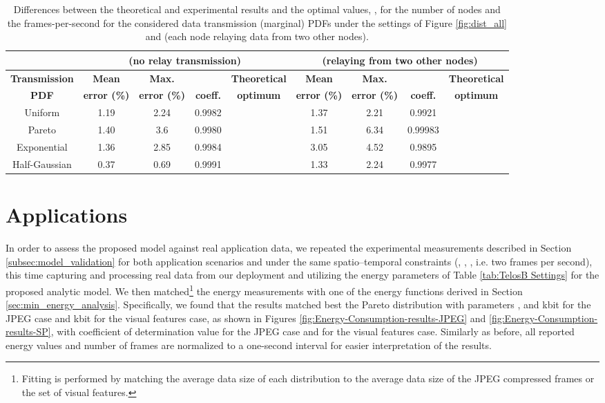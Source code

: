 \documentclass[twocolumn,english]{IEEEtran}
\providecommand{\tabularnewline}{\\}
\theoremstyle{plain}
\theoremstyle{definition}
\begin{document}
\begin{table*}
\begin{centering}
\caption{Differences between the theoretical and experimental results and the
optimal values, ,
for the number of nodes and the frames-per-second for the considered
data transmission (marginal) PDFs under the settings of Figure \ref{fig:dist_all}
and  (each node relaying data from two other nodes).\label{tab:Diff-theory&experiment-1-1}}

\par\end{centering}

\centering{}\begin{tabular}{|c|c|c|c|c|c|c|c|c|}
\hline 
 & \multicolumn{4}{c|}{\textbf{ (no relay transmission)}} & \multicolumn{4}{c|}{\textbf{ (relaying from two other nodes)}}\tabularnewline
\hline 
\textbf{Transmission}  & \textbf{Mean}  & \textbf{Max.}  & \textbf{}  & \textbf{Theoretical}  & \textbf{Mean}  & \textbf{Max.}  & \textbf{}  & \textbf{Theoretical} \tabularnewline
\textbf{PDF}  & \textbf{error (\%)}  & \textbf{error (\%)}  & \textbf{coeff.}  & \textbf{optimum} & \textbf{error (\%)}  & \textbf{error (\%)}  & \textbf{coeff.}  & \textbf{optimum}\tabularnewline
\hline 
\hline 
Uniform  & 1.19  & 2.24  & 0.9982  &   & 1.37  & 2.21  & 0.9921  &  \tabularnewline
\hline 
Pareto   & 1.40  & 3.6  & 0.9980  &   & 1.51  & 6.34  & 0.99983  &  \tabularnewline
\hline 
Exponential  & 1.36  & 2.85  & 0.9984  &   & 3.05  & 4.52  & 0.9895  &  \tabularnewline
\hline 
Half-Gaussian  & 0.37  & 0.69  & 0.9991  &   & 1.33  & 2.24  & 0.9977  &  \tabularnewline
\hline 
\end{tabular}
\end{table*}



\section{Applications\label{sec:Applications}}

In order to assess the proposed model against real application data,
we repeated the experimental measurements described in Section \ref{subsec:model_validation}
for both application scenarios and under the same spatio--temporal
constraints (, , , i.e. two
frames per second), this time capturing and processing real data from
our deployment and utilizing the energy parameters of Table \ref{tab:TelosB Settings}
for the proposed analytic model. We then matched\footnote{Fitting is performed by matching the average data size  of each
distribution to the average data size of the JPEG compressed frames
or the set of visual features.} the energy measurements with one of the energy functions derived
in Section \ref{sec:min_energy_analysis}. Specifically, we found
that the results matched best the Pareto distribution with parameters
,  and  kbit for the JPEG case and 
kbit for the visual features case, as shown in Figures \ref{fig:Energy-Consumption-results-JPEG}
and \ref{fig:Energy-Consumption-results-SP}, with coefficient of
determination value  for the JPEG case and 
for the visual features case. Similarly as before, all reported energy
values and number of frames are normalized to a one-second interval
for easier interpretation of the results.
\end{document}
